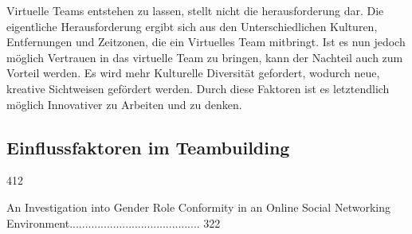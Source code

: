 \documentclass[a4paper,11pt]{article}%
\renewcommand{\\}{\vspace*{0.5\baselineskip} \newline}
\begin{document}
Virtuelle Teams entstehen zu lassen, stellt nicht die herausforderung dar. Die eigentliche Herausforderung ergibt sich aus den Unterschiedlichen Kulturen, Entfernungen und Zeitzonen, die ein Virtuelles Team mitbringt. Ist es nun jedoch möglich Vertrauen in das virtuelle Team zu bringen, kann der Nachteil auch zum Vorteil werden. Es wird mehr Kulturelle Diversität gefordert, wodurch neue, kreative Sichtweisen gefördert werden. Durch diese Faktoren ist es letztendlich möglich Innovativer zu Arbeiten und zu denken. \citep{dyer1995team} \citep[p.405-416]{milliken1996searching}

	\subsection{Einflussfaktoren im Teambuilding}


412

	
	
An Investigation into Gender Role Conformity in an Online Social
Networking Environment.......................................... 322
\end{document}
